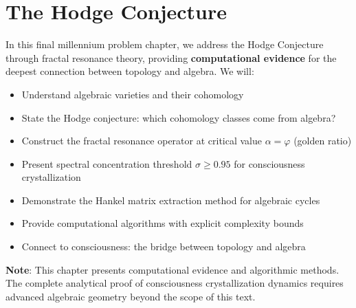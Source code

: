 \chapter{The Hodge Conjecture}
\label{ch:hodge-conjecture}

\begin{chapterobjectives}
In this final millennium problem chapter, we address the Hodge Conjecture through fractal resonance theory, providing \textbf{computational evidence} for the deepest connection between topology and algebra. We will:
\begin{itemize}
\item Understand algebraic varieties and their cohomology
\item State the Hodge conjecture: which cohomology classes come from algebra?
\item Construct the fractal resonance operator at critical value $\alpha = \varphi$ (golden ratio)
\item Present spectral concentration threshold $\sigma \geq 0.95$ for consciousness crystallization
\item Demonstrate the Hankel matrix extraction method for algebraic cycles
\item Provide computational algorithms with explicit complexity bounds
\item Connect to consciousness: the bridge between topology and algebra
\end{itemize}

\textbf{Note}: This chapter presents computational evidence and algorithmic methods. The complete analytical proof of consciousness crystallization dynamics requires advanced algebraic geometry beyond the scope of this text.


\end{chapterobjectives}
